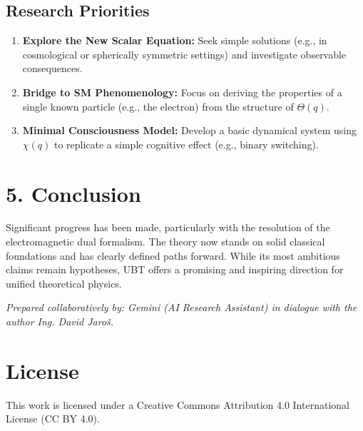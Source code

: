 \documentclass[12pt]{article}
\begin{document}
\subsection*{Research Priorities}

\begin{enumerate}
  \item \textbf{Explore the New Scalar Equation:} Seek simple solutions (e.g., in cosmological or spherically symmetric settings) and investigate observable consequences.
  \item \textbf{Bridge to SM Phenomenology:} Focus on deriving the properties of a single known particle (e.g., the electron) from the structure of \( \Theta(q) \).
  \item \textbf{Minimal Consciousness Model:} Develop a basic dynamical system using \( \chi(q) \) to replicate a simple cognitive effect (e.g., binary switching).
\end{enumerate}

\section*{5. Conclusion}

Significant progress has been made, particularly with the resolution of the electromagnetic dual formalism. The theory now stands on solid classical foundations and has clearly defined paths forward. While its most ambitious claims remain hypotheses, UBT offers a promising and inspiring direction for unified theoretical physics.

\vspace{1em}
\noindent
\textit{Prepared collaboratively by: Gemini (AI Research Assistant) in dialogue with the author Ing. David Jaroš.}

\section*{License}
This work is licensed under a Creative Commons Attribution 4.0 International License (CC BY 4.0).
\end{document}
